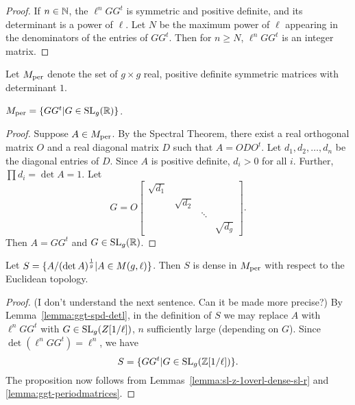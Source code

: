 \documentclass{amsart}
\begin{document}
\begin{proof}
  If $n \in \mathbb{N}$, the $\ell^n GG^t$ is symmetric and positive definite, and its determinant is a power of $\ell$. Let $N$ be the maximum power of $\ell$ appearing in the denominators of the entries of $GG^t$. Then for $n \geq N$, $\ell^n GG^t$ is an integer matrix.
\end{proof}


\begin{definition}
  Let $M_{\textrm{per}}$ denote the set of $g \times g$ real, positive definite symmetric matrices  with determinant $1$.
\end{definition}

\begin{lemma}\label{lemma:ggt-periodmatrices}
  $M_{\textrm{per}} = \{GG^t | G \in \operatorname{SL}_g(\mathbb{R})\}$.
\end{lemma}

\begin{proof}
  Suppose $A \in M_{\textrm{per}}$. By the Spectral Theorem, there exist a real orthogonal matrix $O$ and a real diagonal matrix $D$ such that $A = ODO^t$. Let $d_1, d_2, \dots, d_n$ be the diagonal entries of $D$. Since $A$ is positive definite, $d_i > 0$ for all $i$. Further, $\prod d_i = \det A = 1$. Let
  \[
    G = O
    \begin{bmatrix}
      \sqrt{d_1} & & & \\
      & \sqrt{d_2} & & \\
      & & \ddots & \\
      & & & \sqrt{d_{g}}
    \end{bmatrix}.
\]
Then $A = GG^t$ and $G \in \operatorname{SL}_g(\mathbb{R})$.
\end{proof}

\begin{proposition}\label{prop:A-over-detA}
  Let $S = {\{A/(\det A)^{\frac{1}{g}} | A \in M(g,\ell)\}}$. Then $S$ is dense in $M_{\textrm{per}}$ with respect to the Euclidean topology.
\end{proposition}

\begin{proof}
  (I don't understand the next sentence. Can it be made more precise?) By Lemma~\ref{lemma:ggt-spd-detl}, in the definition of $S$ we may replace $A$ with $\ell^n GG^t$ with $G \in \operatorname{SL}_g(Z[1/\ell])$, $n$ sufficiently large (depending on $G$). Since $\det (\ell^n GG^t) = \ell^n$, we have
  \[
    S = \{GG^t | G \in \operatorname{SL}_g(\mathbb{Z}[1/\ell])\}.
  \]
  The proposition now follows from Lemmas~\ref{lemma:sl-z-1overl-dense-sl-r} and \ref{lemma:ggt-periodmatrices}.
\end{proof}
\end{document}
